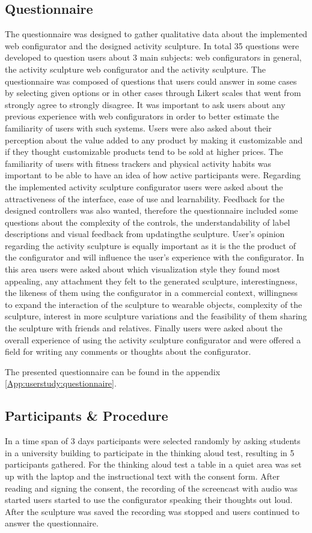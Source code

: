 \documentclass[../medieninformatik-arbeit.tex]{subfiles}
\begin{document}
\subsection{Questionnaire}
The questionnaire was designed to gather qualitative data about the implemented web configurator and the designed activity sculpture. In total 35 questions were developed to question users about 3 main subjects: web configurators in general, the activity sculpture web configurator and the activity sculpture. The questionnaire was composed of questions that users could answer in some cases by selecting given options or in other cases through Likert scales that went from strongly agree to strongly disagree. It was important to ask users about any previous experience with web configurators in order to better estimate the familiarity of users with such systems. Users were also asked about their perception about the value added to any product by making it customizable and if they thought customizable products tend to be sold at higher prices. The familiarity of users with fitness trackers and physical activity habits was important to be able to have an idea of how active participants were. Regarding the implemented activity sculpture configurator users were asked about the attractiveness of the interface, ease of use and learnability. Feedback for the designed controllers was also wanted, therefore the questionnaire included some questions about the complexity of the controls, the understandability of label descriptions and visual feedback from updatingthe sculpture. User's opinion regarding the activity sculpture is equally important as it is the the product of the configurator and will influence the user's experience with the configurator. In this area users were asked about which visualization style they found most appealing, any attachment they felt to the generated sculpture, interestingness, the likeness of them using the configurator in a commercial context, willingness to expand the interaction of the sculpture to wearable objects, complexity of the sculpture, interest in more sculpture variations  and the feasibility of them sharing the sculpture with friends and relatives.
Finally users were asked about the overall experience of using the activity sculpture configurator and were offered a field for writing any comments or thoughts about the configurator. 

The presented questionnaire can be found in the appendix \ref{App:userstudy:questionnaire}.

\subsection{Participants \& Procedure}
In a time span of 3 days participants were selected randomly by asking students in a university building to participate in the thinking aloud test, resulting in 5 participants gathered. For the thinking aloud test a table in a quiet area was set up with the laptop and the instructional text with the consent form. After reading and signing the consent, the recording of the screencast with audio was started  users started to use the configurator speaking their thoughts out loud. After the sculpture was saved the recording was stopped and users continued to answer the questionnaire. 
\end{document}
